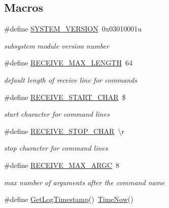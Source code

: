 \subsection*{Macros}
\begin{DoxyCompactItemize}
\item 
\#define \hyperlink{group__subsys_gac13b39d92263b3c765189651110c64f3}{S\+Y\+S\+T\+E\+M\+\_\+\+V\+E\+R\+S\+I\+O\+N}~0x03010001u
\begin{DoxyCompactList}\small\item\em subsystem module version number \end{DoxyCompactList}\item 
\#define \hyperlink{group__subsys_gaf7b1ce1a8ab4b9ec92d8773f90cb991c}{R\+E\+C\+E\+I\+V\+E\+\_\+\+M\+A\+X\+\_\+\+L\+E\+N\+G\+T\+H}~64
\begin{DoxyCompactList}\small\item\em default length of receive line for commands \end{DoxyCompactList}\item 
\#define \hyperlink{group__subsys_ga91e743817f50d117deeaca986b4c8e4d}{R\+E\+C\+E\+I\+V\+E\+\_\+\+S\+T\+A\+R\+T\+\_\+\+C\+H\+A\+R}~\textquotesingle{}\$\textquotesingle{}
\begin{DoxyCompactList}\small\item\em start character for command lines \end{DoxyCompactList}\item 
\#define \hyperlink{group__subsys_ga37a39f2cef5d4f3989c8932c3d7346f6}{R\+E\+C\+E\+I\+V\+E\+\_\+\+S\+T\+O\+P\+\_\+\+C\+H\+A\+R}~\textquotesingle{}\textbackslash{}r\textquotesingle{}
\begin{DoxyCompactList}\small\item\em stop character for command lines \end{DoxyCompactList}\item 
\#define \hyperlink{group__subsys_ga7295a34bc57dde069397cf280dc94f32}{R\+E\+C\+E\+I\+V\+E\+\_\+\+M\+A\+X\+\_\+\+A\+R\+G\+C}~8
\begin{DoxyCompactList}\small\item\em max number of arguments after the command name \end{DoxyCompactList}\item 
\#define \hyperlink{group__subsys_ga5ecc8d4d514ebae84adabf96e0517f6f}{Get\+Log\+Timestamp}()~\hyperlink{group__timing_gad33d57773db985176e2722aeebfee9cc}{Time\+Now}()
\end{DoxyCompactItemize}
